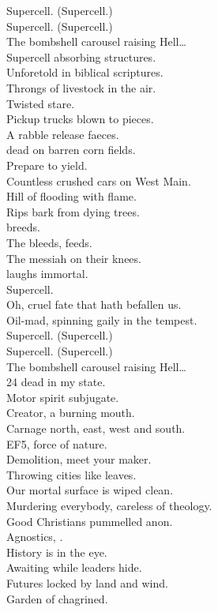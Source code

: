 Supercell. (Supercell.) \\
Supercell. (Supercell.) \\
The bombshell carousel raising Hell… \\

Supercell absorbing structures. \\
Unforetold in biblical scriptures. \\
Throngs of livestock in the air. \\
Twisted stare. \\
Pickup trucks blown to pieces. \\
A rabble release faeces. \\
 dead on barren corn fields. \\
Prepare to yield. \\

Countless crushed cars on West Main. \\
Hill of  flooding with flame. \\
Rips bark from dying trees. \\
 breeds. \\
The  bleeds,  feeds. \\
The messiah on their knees. \\
 laughs immortal. \\
Supercell. \\

Oh, cruel fate that hath befallen us. \\
Oil-mad, spinning gaily in the tempest. \\

Supercell. (Supercell.) \\
Supercell. (Supercell.) \\
The bombshell carousel raising Hell… \\

24 dead in my state. \\
Motor spirit subjugate. \\
Creator, a burning mouth. \\
Carnage north, east, west and south. \\
EF5, force of nature. \\
Demolition, meet your maker. \\
Throwing cities like leaves. \\
Our mortal surface is wiped clean. \\

Murdering everybody, careless of theology. \\
Good Christians pummelled anon. \\
Agnostics, . \\
History is in the eye. \\
Awaiting  while leaders hide. \\
Futures locked by land and wind. \\
Garden of  chagrined. \\

